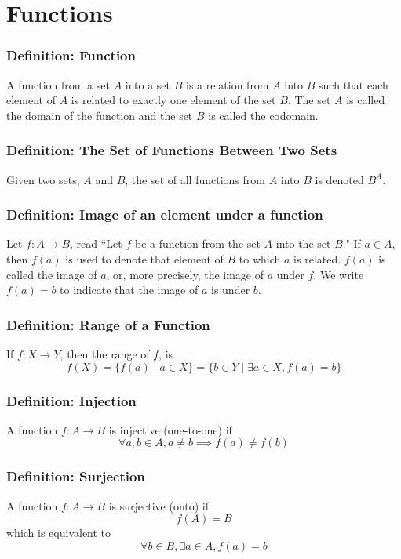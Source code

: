 \documentclass{article}
\begin{document}
\section{Functions}
\subsubsection*{Definition: Function}
A function from a set $A$ into a set $B$ is a relation from $A$ into $B$ such that each element of $A$ is related to exactly one element of the set $B$. The set $A$ is called the domain of the function and the set $B$ is called the codomain. 

\subsubsection*{Definition: The Set of Functions Between Two Sets}
Given two sets, $A$ and $B$, the set of all functions from $A$ into $B$ is denoted $B^A$. 

\subsubsection*{Definition: Image of an element under a function}
Let $f : A \rightarrow B$, read ``Let $f$ be a function from the set $A$ into the set $B$." If $a \in A$, then $f(a)$ is used to denote that element of $B$ to which $a$ is related. $f(a)$ is called the image of $a$, or, more precisely, the image of $a$ under $f$. We write $f(a) = b$ to indicate that the image of $a$ is under $b$. 

\subsubsection*{Definition: Range of a Function}
If $f : X \rightarrow Y$, then the range of $f$, is
$$f(X) = \{ f(a) \mid a \in X \} = \{b \in Y \mid \exists a \in X , f(a) = b \}$$

\subsubsection*{Definition: Injection}
A function $f : A \rightarrow B$ is injective (one-to-one) if
$$\forall a, b \in A, a \neq b \implies f(a) \neq f(b)$$

\subsubsection*{Definition: Surjection}
A function $f: A\rightarrow B$ is surjective (onto) if
$$f(A) = B$$
which is equivalent to
$$\forall b \in B, \exists a \in A , f(a) = b$$
\end{document}
